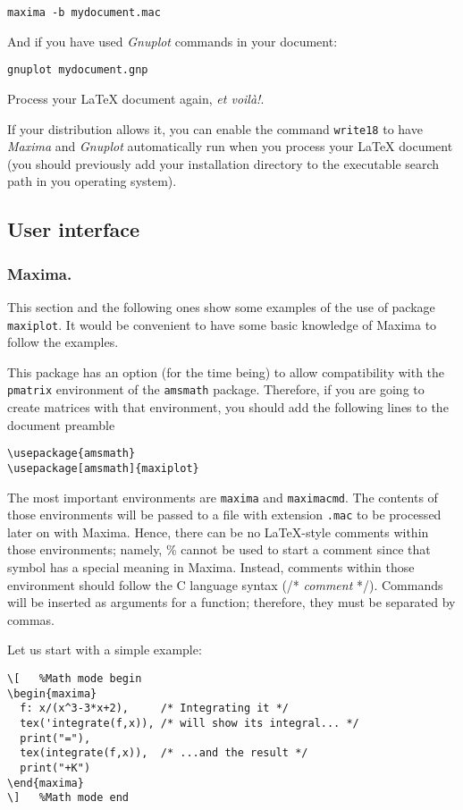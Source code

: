 \documentclass[11pt,a4paper]{article}
\def\Maxima{\emph{Maxima}}
\def\Gnuplot{\emph{Gnuplot}}
\begin{document}
\texttt{maxima -b mydocument.mac}

And if you have used \Gnuplot{} commands in your document:

\texttt{gnuplot mydocument.gnp}

Process your \LaTeX{} document again, \textit{et voil\`a!}.

If your distribution allows it, you can enable the command
\texttt{write18} to have \Maxima{} and \Gnuplot{} automatically run
when you process your \LaTeX{} document (you should previously add
your installation directory to the executable search path in you
operating system). 

\subsection{User interface}
\subsubsection{Maxima.}
This section and the following ones show some examples of the use of
package \texttt{maxiplot}. It would be convenient to have some basic
knowledge of Maxima to follow the examples.

This package has an option (for the time being) to allow compatibility
with the \texttt{pmatrix} environment of the \texttt{amsmath}
package. Therefore, if you are going to create matrices with that
environment, you should add the following lines to the document preamble
\begin{verbatim}
\usepackage{amsmath}
\usepackage[amsmath]{maxiplot}
\end{verbatim}

The most important environments are \texttt{maxima} and
\texttt{maximacmd}. The contents of those environments will be passed
to a file with extension \texttt{.mac} to be processed later on with
Maxima. Hence, there can be no \LaTeX-style comments within those
environments; namely, \% cannot be used to start a comment since that
symbol has a special meaning in Maxima. Instead, comments within those
environment should follow the C language syntax (/* \textit{comment}
*/). Commands will be inserted as arguments for a function; therefore,
they must be separated by commas.

Let us start with a simple example:
\begin{verbatim}
\[   %Math mode begin
\begin{maxima}
  f: x/(x^3-3*x+2),     /* Integrating it */
  tex('integrate(f,x)), /* will show its integral... */
  print("="),
  tex(integrate(f,x)),  /* ...and the result */
  print("+K")
\end{maxima}
\]   %Math mode end
\end{verbatim}
\end{document}
